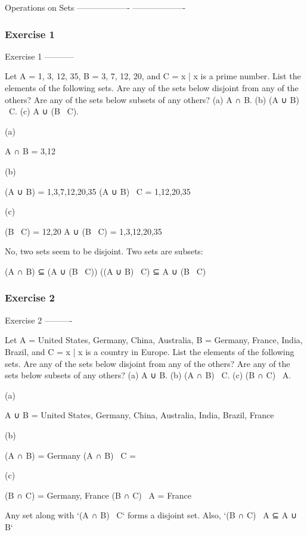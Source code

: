 Operations on Sets
-------------------
-------------------
\subsubsection{Exercise 1}
Exercise 1
-----------

    Let A = {1, 3, 12, 35}, B = {3, 7, 12, 20}, and C = {x | x is a prime
    number}. List the elements of the following sets. Are any of the sets
    below disjoint from any of the others? Are any of the sets below subsets
    of any others?
    (a) A ∩ B.
    (b) (A ∪ B) \ C.
    (c) A ∪ (B \ C).

(a)

    A ∩ B = {3,12}

(b)

    (A ∪ B) = {1,3,7,12,20,35}
    (A ∪ B) \ C = {1,12,20,35}

(c)

    (B \ C) = {12,20}
    A ∪ (B \ C) = {1,3,12,20,35}

No, two sets seem to be disjoint.
Two sets are subsets:

    (A ∩ B) ⊆ (A ∪ (B \ C))
    ((A ∪ B) \ C) ⊆ A ∪ (B \ C)

\subsubsection{Exercise 2}
Exercise 2
----------

    Let A = {United States, Germany, China, Australia}, B = {Germany,
    France, India, Brazil}, and C = {x | x is a country in Europe}. List the
    elements of the following sets. Are any of the sets below disjoint from
    any of the others? Are any of the sets below subsets of any others?
    (a) A ∪ B.
    (b) (A ∩ B) \ C.
    (c) (B ∩ C) \ A.

(a)

    A ∪ B = {United States, Germany, China, Australia, India, Brazil,
    France}

(b)

    (A ∩ B) = {Germany}
    (A ∩ B) \ C = { }

(c)

    (B ∩ C) = {Germany, France}
    (B ∩ C) \ A = {France}

Any set along with `(A ∩ B) \ C` forms a disjoint set. Also, `(B ∩ C)
\ A ⊆ A ∪ B`


